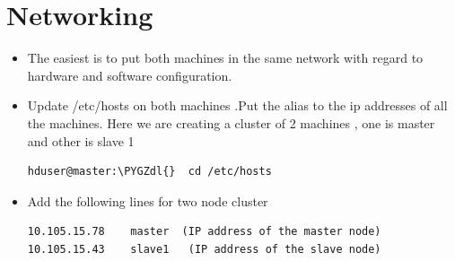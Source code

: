 \documentclass[a4paper,12pt,oneside]{sphinxmanual}
\def\PYGZdl{\char`\$}
\begin{document}
\section{Networking}
\label{document:networking}\begin{itemize}
\item {} 
The easiest is to put both machines in the same network with regard to hardware and   software configuration.

\item {} 
Update /etc/hosts on both machines .Put the alias to the ip addresses of all the machines. Here we are creating a cluster of 2 machines , one is master and other is slave 1

\begin{Verbatim}[commandchars=\\\{\}]
hduser@master:\PYGZdl{}  cd /etc/hosts
\end{Verbatim}

\item {} 
Add the following lines for two node cluster

\begin{Verbatim}[commandchars=\\\{\}]
10.105.15.78    master  (IP address of the master node)
10.105.15.43    slave1   (IP address of the slave node)
\end{Verbatim}

\end{itemize}
\begin{figure}[htbp]
\centering

\end{figure}
\end{document}
